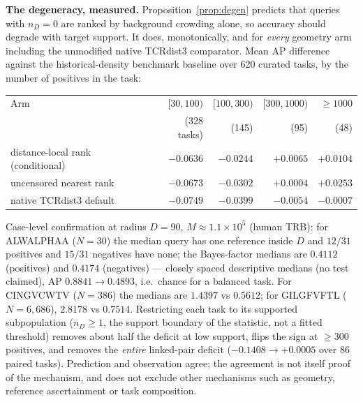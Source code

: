 \documentclass[10pt,a4paper]{article}
\theoremstyle{definition}
\begin{document}
\textbf{The degeneracy, measured.} Proposition~\ref{prop:degen} predicts that queries with $n_D=0$
are ranked by background crowding alone, so accuracy should degrade with target support. It does,
monotonically, and for \emph{every} geometry arm including the unmodified native TCRdist3
comparator. Mean AP difference against the historical-density benchmark baseline over 620 curated tasks, by the number of
positives in the task:

\begin{center}\small
\begin{tabular}{@{}lrrrr@{}}
\toprule
Arm & $[30,100)$ & $[100,300)$ & $[300,1000)$ & $\ge1000$\\
 & (328 tasks) & (145) & (95) & (48)\\
\midrule
distance-local rank (conditional) & $-0.0636$ & $-0.0244$ & $+0.0065$ & $+0.0104$\\
uncensored nearest rank & $-0.0673$ & $-0.0302$ & $+0.0004$ & $+0.0253$\\
native TCRdist3 default & $-0.0749$ & $-0.0399$ & $-0.0054$ & $-0.0007$\\
\bottomrule
\end{tabular}
\end{center}

Case-level confirmation at radius $D=90$, $M\approx1.1\times10^5$ (human TRB): for ALWALPHAA
($N=30$) the median query has one reference inside $D$ and $12/31$ positives and $15/31$ negatives
have none; the Bayes-factor medians are $0.4112$ (positives) and $0.4174$ (negatives) --- closely spaced descriptive medians (no test claimed), AP $0.8841\to0.4893$, i.e.\ chance for a balanced task. For CINGVCWTV ($N=386$)
the medians are $1.4397$ vs $0.5612$; for GILGFVFTL ($N=6{,}686$), $2.8178$ vs $0.7514$.
Restricting each task to its supported subpopulation ($n_D\ge1$, the support boundary of the
statistic, not a fitted threshold) removes about half the deficit at low support, flips the sign at
$\ge300$ positives, and removes the \emph{entire} linked-pair deficit ($-0.1408\to+0.0005$ over 86
paired tasks). Prediction and observation agree; the agreement is not itself proof of the
mechanism, and does not exclude other mechanisms such as geometry, reference ascertainment or task composition.
\end{document}
